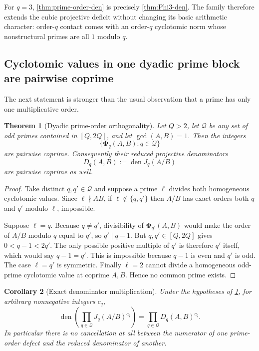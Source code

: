 \documentclass[11pt]{article}
\newtheorem{theorem}{Theorem}[section]
\newtheorem{corollary}[theorem]{Corollary}
\theoremstyle{definition}
\theoremstyle{remark}
\newcommand{\den}{\operatorname{den}}
\newcommand{\PhiHom}{\boldsymbol{\Phi}}
\begin{document}
For $q=3$, \cref{thm:prime-order-den} is precisely \cref{thm:Phi3-den}.  The family therefore extends the cubic projective deficit without changing its basic arithmetic character: order-$q$ contact comes with an order-$q$ cyclotomic norm whose nonstructural primes are all $1$ modulo $q$.

\subsection{Cyclotomic values in one dyadic prime block are pairwise coprime}

The next statement is stronger than the usual observation that a prime has only one multiplicative order.

\begin{theorem}[Dyadic prime-order orthogonality]\label{thm:dyadic-order-orthogonality}
Let $Q>2$, let $\mathcal Q$ be any set of odd primes contained in $[Q,2Q]$, and let $\gcd(A,B)=1$.  Then the integers
\begin{equation}\label{eq:Phi-q-family}
 \bigl\{\PhiHom_q(A,B):q\in\mathcal Q\bigr\}
\end{equation}
are pairwise coprime.  Consequently their reduced projective denominators
\begin{equation}\label{eq:Dq}
 D_q(A,B):=\den J_q(A/B)
\end{equation}
are pairwise coprime as well.
\end{theorem}

\begin{proof}
Take distinct $q,q'\in\mathcal Q$ and suppose a prime $\ell$ divides both homogeneous cyclotomic values.  Since $\ell\nmid AB$, if $\ell\notin\{q,q'\}$ then $A/B$ has exact orders both $q$ and $q'$ modulo $\ell$, impossible.

Suppose $\ell=q$.  Because $q\ne q'$, divisibility of $\PhiHom_{q'}(A,B)$ would make the order of $A/B$ modulo $q$ equal to $q'$, so $q'\mid q-1$.  But $q,q'\in[Q,2Q]$ gives $0<q-1<2q'$.  The only possible positive multiple of $q'$ is therefore $q'$ itself, which would say $q-1=q'$.  This is impossible because $q-1$ is even and $q'$ is odd.  The case $\ell=q'$ is symmetric.  Finally $\ell=2$ cannot divide a homogeneous odd-prime cyclotomic value at coprime $A,B$.  Hence no common prime exists.
\end{proof}

\begin{corollary}[Exact denominator multiplication]\label{cor:exact-den-product}
Under the hypotheses of \cref{thm:dyadic-order-orthogonality}, for arbitrary nonnegative integers $c_q$,
\begin{equation}\label{eq:product-Jq}
 \den\left(\prod_{q\in\mathcal Q}J_q(A/B)^{c_q}\right)
 =\prod_{q\in\mathcal Q}D_q(A,B)^{c_q}.
\end{equation}
In particular there is no cancellation at all between the numerator of one prime-order defect and the reduced denominator of another.
\end{corollary}
\end{document}

